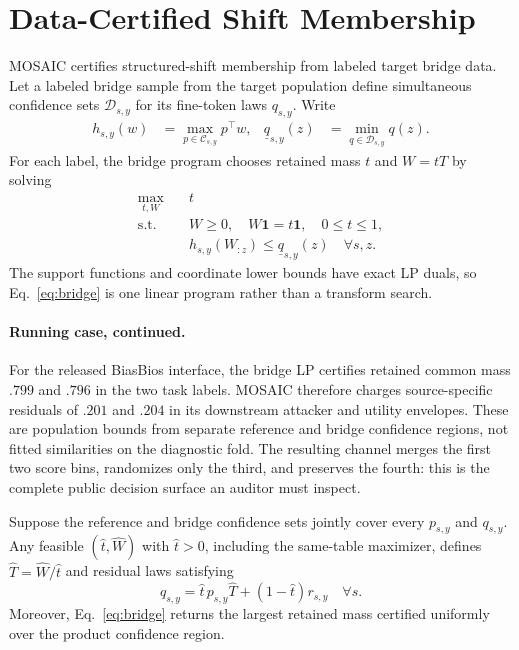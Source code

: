 \section{Data-Certified Shift Membership}

MOSAIC certifies structured-shift membership from labeled target bridge data.
Let a labeled bridge sample from the target
population define simultaneous confidence sets
$\mathcal D_{s,y}$ for its fine-token laws $q_{s,y}$. Write
\begin{align}
 h_{s,y}(w)&=\max_{p\in\mathcal C_{s,y}}p^\top w, &
 \underline q_{s,y}(z)&=\min_{q\in\mathcal D_{s,y}}q(z).
\end{align}
For each label, the bridge program chooses retained mass $t$ and
$W=tT$ by solving
\begin{equation}
 \begin{aligned}
 \max_{t,W}\quad&t\\
 \text{s.t.}\quad&W\geq0,\quad W\mathbf1=t\mathbf1,\quad0\leq t\leq1,\\
 &h_{s,y}(W_{:z})\leq\underline q_{s,y}(z)
 \quad\forall s,z.
 \end{aligned}
 \label{eq:bridge}
\end{equation}
The support functions and coordinate lower bounds have exact LP duals, so
Eq.~\eqref{eq:bridge} is one linear program rather than a transform search.

\paragraph{Running case, continued.}
For the released BiasBios interface, the bridge LP certifies retained common
mass $.799$ and $.796$ in the two task labels. MOSAIC therefore charges
source-specific residuals of $.201$ and $.204$ in its downstream attacker and
utility envelopes. These are population bounds from separate reference and
bridge confidence regions, not fitted similarities on the diagnostic fold.
The resulting channel merges the first two score bins, randomizes only the
third, and preserves the fourth: this is the complete public decision surface
an auditor must inspect.

\begin{theorem}
Suppose the reference and bridge confidence sets jointly cover every
$p_{s,y}$ and $q_{s,y}$. Any feasible $(\widehat t,\widehat W)$ with
$\widehat t>0$, including the same-table maximizer, defines
$\widehat T=\widehat W/\widehat t$ and residual laws satisfying
\begin{equation}
 q_{s,y}=\widehat t\,p_{s,y}\widehat T
 +(1-\widehat t)r_{s,y}\quad\forall s.
 \label{eq:bridge-membership}
\end{equation}
Moreover, Eq.~\eqref{eq:bridge} returns the largest retained mass certified
uniformly over the product confidence region.
\end{theorem}

